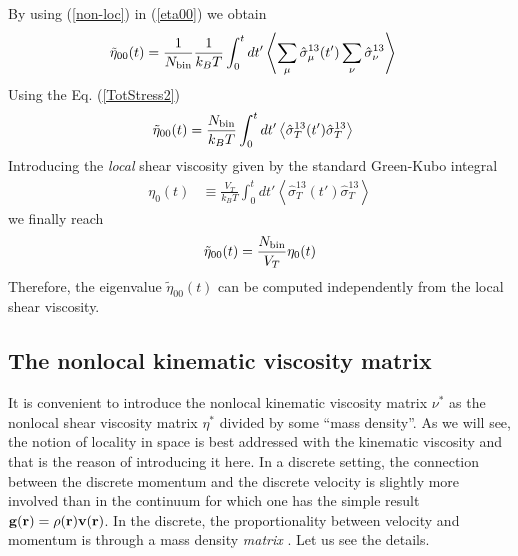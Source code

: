 \documentclass[a4paper,openright,12pt]{book}
\newcommand{\llangle}{\left\langle}
\newcommand{\rrangle}{\right\rangle}
\begin{document}
By using (\ref{non-loc}) in (\ref{eta00}) we obtain
\begin{align}
    \tilde{\eta}_{00}(t)&=\frac{1}{N_{\rm bin}}\frac{1}{k_BT}\int_0^tdt'\llangle \sum_{\mu}\hat{\sigma}^{13}_{\mu}(t')\sum_{\nu}\hat{\sigma}^{13}_{\nu}\rrangle
\end{align}
Using the Eq. (\ref{TotStress2})
\begin{align}
    \tilde{\eta}_{00}(t)&=\frac{N_{\rm bin}}{k_BT}\int_0^tdt'\llangle \hat{\sigma}^{13}_T(t')\hat{\sigma}^{13}_T\rrangle
\end{align}
Introducing the \textit{local}  shear viscosity given by the standard Green-Kubo
integral
\begin{align}
  \eta_0(t) &\equiv \frac{V_T}{k_BT}\int_0^t dt'\llangle \hat{\sigma}_T^{13}(t')\hat{\sigma}_T^{13}
\rrangle
\label{etat}
\end{align}
we finally reach 
\begin{align}
    \tilde{\eta}_{00}(t)=\frac{N_{\rm bin}}{V_T}\eta_0(t)
\end{align}
Therefore, the eigenvalue $\tilde{\eta}_{00}(t)$ can be computed independently from
the local shear viscosity.

\subsection{The nonlocal kinematic viscosity matrix}
It is convenient to introduce the nonlocal kinematic viscosity matrix
$\nu^*$ as  the nonlocal shear  viscosity matrix $\eta^*$  divided by
some ``mass density''. As we will see, the notion of locality in space
is best addressed with the kinematic  viscosity and that is the reason
of introducing it here. In  a discrete setting, the connection between
the  discrete momentum  and  the discrete  velocity  is slightly  more
involved than  in the continuum  for which  one has the  simple result
${\bf g}({\bf  r})=\rho({\bf r}){\bf  v}({\bf r})$.  In  the discrete,
the proportionality  between velocity and  momentum is through  a mass
density \textit{matrix} \cite{3}.  Let us see the details.
\end{document}
